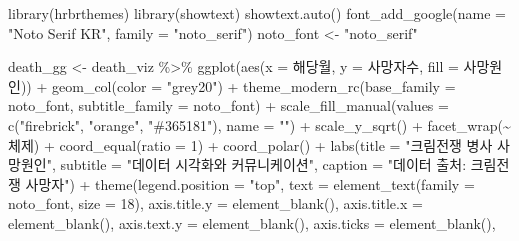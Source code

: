 \documentclass[
  letterpaper,
  chapter,a4paper,showtrims,openright,hidelinks]{oblivoir}
\newenvironment{Shaded}{\begin{snugshade}}{\end{snugshade}}
\newcommand{\AttributeTok}[1]{\textcolor[rgb]{0.40,0.45,0.13}{#1}}
\newcommand{\DecValTok}[1]{\textcolor[rgb]{0.68,0.00,0.00}{#1}}
\newcommand{\FunctionTok}[1]{\textcolor[rgb]{0.28,0.35,0.67}{#1}}
\newcommand{\NormalTok}[1]{\textcolor[rgb]{0.00,0.23,0.31}{#1}}
\newcommand{\OtherTok}[1]{\textcolor[rgb]{0.00,0.23,0.31}{#1}}
\newcommand{\SpecialCharTok}[1]{\textcolor[rgb]{0.37,0.37,0.37}{#1}}
\newcommand{\StringTok}[1]{\textcolor[rgb]{0.13,0.47,0.30}{#1}}
\begin{document}
\begin{Shaded}
\begin{Highlighting}[]
\FunctionTok{library}\NormalTok{(hrbrthemes) }
\FunctionTok{library}\NormalTok{(showtext)}
\FunctionTok{showtext.auto}\NormalTok{()}
\FunctionTok{font\_add\_google}\NormalTok{(}\AttributeTok{name =} \StringTok{"Noto Serif KR"}\NormalTok{, }\AttributeTok{family =} \StringTok{"noto\_serif"}\NormalTok{)}
\NormalTok{noto\_font }\OtherTok{\textless{}{-}} \StringTok{"noto\_serif"}

\NormalTok{death\_gg }\OtherTok{\textless{}{-}}\NormalTok{ death\_viz }\SpecialCharTok{\%\textgreater{}\%} 
  \FunctionTok{ggplot}\NormalTok{(}\FunctionTok{aes}\NormalTok{(}\AttributeTok{x =}\NormalTok{ 해당월, }\AttributeTok{y =}\NormalTok{ 사망자수, }\AttributeTok{fill =}\NormalTok{ 사망원인)) }\SpecialCharTok{+}
  \FunctionTok{geom\_col}\NormalTok{(}\AttributeTok{color =} \StringTok{"grey20"}\NormalTok{) }\SpecialCharTok{+} 
  \FunctionTok{theme\_modern\_rc}\NormalTok{(}\AttributeTok{base\_family =}\NormalTok{ noto\_font, }\AttributeTok{subtitle\_family =}\NormalTok{ noto\_font) }\SpecialCharTok{+} 
  \FunctionTok{scale\_fill\_manual}\NormalTok{(}\AttributeTok{values =} \FunctionTok{c}\NormalTok{(}\StringTok{"firebrick"}\NormalTok{, }\StringTok{"orange"}\NormalTok{, }\StringTok{"\#365181"}\NormalTok{), }\AttributeTok{name =} \StringTok{""}\NormalTok{) }\SpecialCharTok{+}
  \FunctionTok{scale\_y\_sqrt}\NormalTok{() }\SpecialCharTok{+}
  \FunctionTok{facet\_wrap}\NormalTok{(}\SpecialCharTok{\textasciitilde{}}\NormalTok{ 체제) }\SpecialCharTok{+} 
  \FunctionTok{coord\_equal}\NormalTok{(}\AttributeTok{ratio =} \DecValTok{1}\NormalTok{) }\SpecialCharTok{+}  
  \FunctionTok{coord\_polar}\NormalTok{() }\SpecialCharTok{+}
  \FunctionTok{labs}\NormalTok{(}\AttributeTok{title =} \StringTok{"크림전쟁 병사 사망원인"}\NormalTok{, }
       \AttributeTok{subtitle =} \StringTok{"데이터 시각화와 커뮤니케이션"}\NormalTok{, }
       \AttributeTok{caption =} \StringTok{"데이터 출처: 크림전쟁 사망자"}\NormalTok{) }\SpecialCharTok{+} 
  \FunctionTok{theme}\NormalTok{(}\AttributeTok{legend.position =} \StringTok{"top"}\NormalTok{, }
        \AttributeTok{text =} \FunctionTok{element\_text}\NormalTok{(}\AttributeTok{family =}\NormalTok{ noto\_font, }\AttributeTok{size =} \DecValTok{18}\NormalTok{),}
        \AttributeTok{axis.title.y =} \FunctionTok{element\_blank}\NormalTok{(),}
        \AttributeTok{axis.title.x =} \FunctionTok{element\_blank}\NormalTok{(),}
        \AttributeTok{axis.text.y =} \FunctionTok{element\_blank}\NormalTok{(),}
        \AttributeTok{axis.ticks =} \FunctionTok{element\_blank}\NormalTok{(),}

\end{Highlighting}
\end{Shaded}
\end{document}
